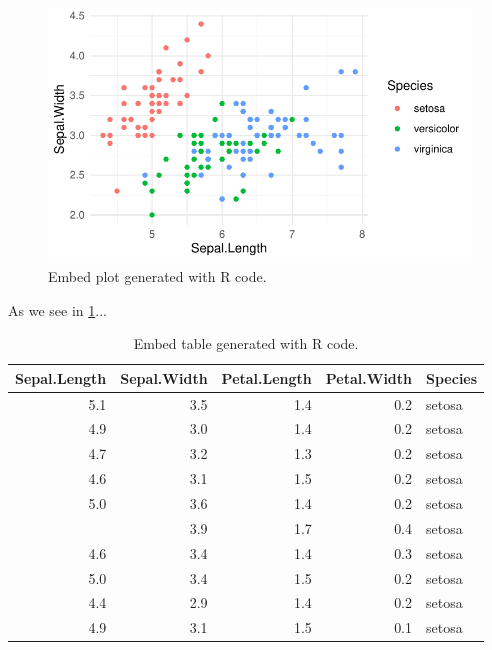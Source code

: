 \documentclass[numbered]{ivt-style/standard}\usepackage[]{graphicx}\usepackage[]{xcolor}
\makeatletter
\def\maxwidth{ %
  \ifdim\Gin@nat@width>\linewidth
    \linewidth
  \else
    \Gin@nat@width
  \fi
}
\newenvironment{knitrout}{}{} %
\providecommand{\ivthline}{}
\makeatother
\begin{document}
\begin{figure}[!ht]
\caption{Embed plot generated with R code.}
\label{fig:r}
\begin{knitrout}
\color{fgcolor}
\includegraphics[width=\maxwidth]{figure/unnamed-chunk-8-1} 
\end{knitrout}
\ivthline
\end{figure}


As we see in \cref{fig:r}...


\begin{table}[!ht]
\caption{Embed table generated with R code.}
\label{tab:r}

\begin{tabular}[t]{rrrrl}
\toprule
Sepal.Length & Sepal.Width & Petal.Length & Petal.Width & Species\\
\midrule
5.1 & 3.5 & 1.4 & 0.2 & setosa\\
4.9 & 3.0 & 1.4 & 0.2 & setosa\\
4.7 & 3.2 & 1.3 & 0.2 & setosa\\
4.6 & 3.1 & 1.5 & 0.2 & setosa\\
5.0 & 3.6 & 1.4 & 0.2 & setosa\\
\addlinespace
5.4 & 3.9 & 1.7 & 0.4 & setosa\\
4.6 & 3.4 & 1.4 & 0.3 & setosa\\
5.0 & 3.4 & 1.5 & 0.2 & setosa\\
4.4 & 2.9 & 1.4 & 0.2 & setosa\\
4.9 & 3.1 & 1.5 & 0.1 & setosa\\
\bottomrule
\end{tabular}


\ivthline
\end{table}
\end{document}
